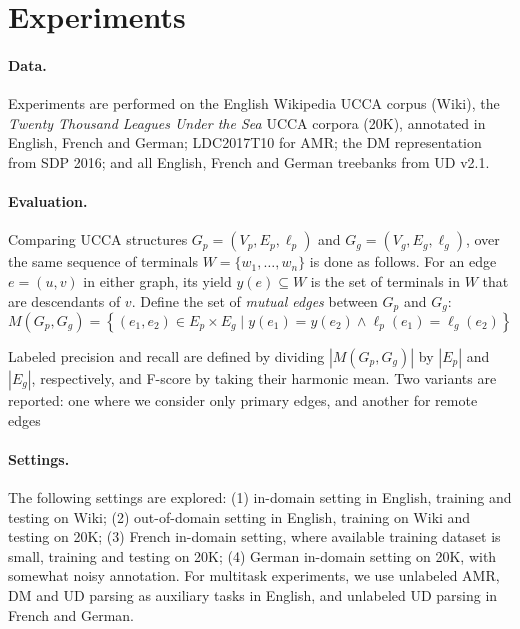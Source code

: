 \documentclass[12pt]{report}
\begin{document}
\section{Experiments}\label{sec:experiments}

\paragraph{Data.}

Experiments are performed on the English Wikipedia UCCA corpus (Wiki),
the \textit{Twenty Thousand Leagues Under the Sea} UCCA corpora (20K),
annotated in English, French and German;
LDC2017T10 for AMR;
the DM representation from SDP 2016;
and all English, French and German treebanks from UD v2.1.


\paragraph{Evaluation.}
Comparing UCCA structures
$G_p=(V_p,E_p,\ell_p)$ and $G_g=(V_g,E_g,\ell_g)$,
over the same sequence of terminals $W = \{w_1,\ldots,w_n\}$
is done as follows.
For an edge $e=(u,v)$ in either graph, its yield $y(e) \subseteq W$ is the
set of terminals in $W$ that are descendants of $v$.
Define the set of \textit{mutual edges} between $G_p$ and $G_g$:
\[
    M(G_p,G_g) =
    \left\{(e_1,e_2) \in E_p \times E_g \;|\;
    y(e_1) = y(e_2) \wedge \ell_p(e_1)=\ell_g(e_2)\right\}
\]

Labeled precision and recall are defined by dividing $|M(G_p,G_g)|$ by $|E_p|$ and $|E_g|$, respectively,
and F-score by taking their harmonic mean.
Two variants are reported: one where we consider only primary edges,
and another for remote edges


\paragraph{Settings.}

The following settings are explored:
(1) in-domain setting in English, training and testing on Wiki;
(2) out-of-domain setting in English, training on Wiki and testing on 20K;
(3) French in-domain setting, where available training dataset is small,
training and testing on 20K;
(4) German in-domain setting on 20K, with somewhat noisy annotation.
For multitask experiments, we use unlabeled AMR, DM and UD parsing as auxiliary tasks in English,
and unlabeled UD parsing in French and German.
\end{document}
